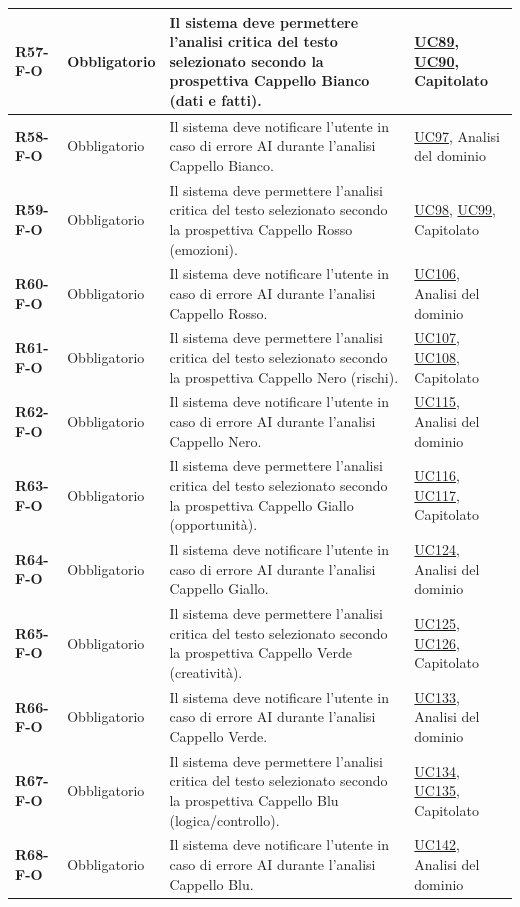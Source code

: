 \begin{longtable}{|p{2.5cm}|p{2.2cm}|p{6.8cm}|p{2.7cm}|}
	\textbf{R57-F-O} & Obbligatorio & Il sistema deve permettere l'analisi critica del testo selezionato secondo la prospettiva Cappello Bianco (dati e fatti). & \hyperlink{uc89}{UC89}, \hyperlink{uc90}{UC90}, Capitolato \\ \hline
	\textbf{R58-F-O} & Obbligatorio & Il sistema deve notificare l'utente in caso di errore AI durante l'analisi Cappello Bianco. & \hyperlink{uc97}{UC97}, Analisi del dominio \\ \hline
	\textbf{R59-F-O} & Obbligatorio & Il sistema deve permettere l'analisi critica del testo selezionato secondo la prospettiva Cappello Rosso (emozioni). & \hyperlink{uc98}{UC98}, \hyperlink{uc99}{UC99}, Capitolato \\ \hline
	\textbf{R60-F-O} & Obbligatorio & Il sistema deve notificare l'utente in caso di errore AI durante l'analisi Cappello Rosso. & \hyperlink{uc106}{UC106}, Analisi del dominio \\ \hline
	\textbf{R61-F-O} & Obbligatorio & Il sistema deve permettere l'analisi critica del testo selezionato secondo la prospettiva Cappello Nero (rischi). & \hyperlink{uc107}{UC107}, \hyperlink{uc108}{UC108}, Capitolato \\ \hline
	\textbf{R62-F-O} & Obbligatorio & Il sistema deve notificare l'utente in caso di errore AI durante l'analisi Cappello Nero. & \hyperlink{uc115}{UC115}, Analisi del dominio \\ \hline
	\textbf{R63-F-O} & Obbligatorio & Il sistema deve permettere l'analisi critica del testo selezionato secondo la prospettiva Cappello Giallo (opportunità). & \hyperlink{uc116}{UC116}, \hyperlink{uc117}{UC117}, Capitolato \\ \hline
	\textbf{R64-F-O} & Obbligatorio & Il sistema deve notificare l'utente in caso di errore AI durante l'analisi Cappello Giallo. & \hyperlink{uc124}{UC124}, Analisi del dominio \\ \hline
	\textbf{R65-F-O} & Obbligatorio & Il sistema deve permettere l'analisi critica del testo selezionato secondo la prospettiva Cappello Verde (creatività). & \hyperlink{uc125}{UC125}, \hyperlink{uc126}{UC126}, Capitolato \\ \hline
	\textbf{R66-F-O} & Obbligatorio & Il sistema deve notificare l'utente in caso di errore AI durante l'analisi Cappello Verde. & \hyperlink{uc133}{UC133}, Analisi del dominio \\ \hline
	\textbf{R67-F-O} & Obbligatorio & Il sistema deve permettere l'analisi critica del testo selezionato secondo la prospettiva Cappello Blu (logica/controllo). & \hyperlink{uc134}{UC134}, \hyperlink{uc135}{UC135}, Capitolato \\ \hline
	\textbf{R68-F-O} & Obbligatorio & Il sistema deve notificare l'utente in caso di errore AI durante l'analisi Cappello Blu. & \hyperlink{uc142}{UC142}, Analisi del dominio \\ \hline


\end{longtable}
